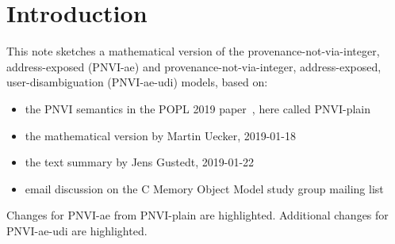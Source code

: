 \documentclass[acmsmall,review,screen]{acmart}\settopmatter{printfolios=true,printccs=false,printacmref=false}
\begin{document}




\maketitle



\newcommand{\myt}[1]{{\color{blue}#1}}
\newcommand{\myu}[1]{{\color{myudicolor}#1}}

\section{Introduction}

This note sketches a mathematical version of the
provenance-not-via-integer, address-exposed (PNVI-ae)
and provenance-not-via-integer, address-exposed, user-disambiguation (PNVI-ae-udi)
models, based on:
\begin{itemize}
\item the PNVI semantics in the POPL 2019
  paper~\cite{cerberus-popl2019}, here called PNVI-plain
\item the mathematical version  by Martin Uecker, 2019-01-18
\item the text summary by Jens Gustedt, 2019-01-22
\item email discussion on the C Memory Object Model study group mailing list
\end{itemize}
Changes for PNVI-ae from PNVI-plain are \myt{highlighted}.
Additional changes for PNVI-ae-udi are \myu{highlighted}. 
\end{document}
